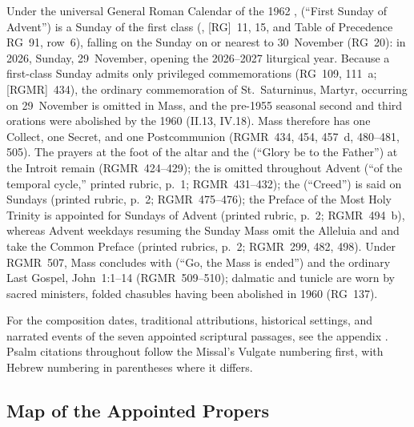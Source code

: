 Under the universal General Roman Calendar of the 1962 ,  (``First Sunday of Advent'') is a Sunday of the first class (,  [RG]~11, 15, and Table of Precedence RG~91, row~6), falling on the Sunday on or nearest to 30~November (RG~20): in 2026, Sunday, 29~November, opening the 2026--2027 liturgical year. Because a first-class Sunday admits only privileged commemorations (RG~109, 111~a;  [RGMR]~434), the ordinary commemoration of St.~Saturninus, Martyr, occurring on 29~November is omitted in Mass, and the pre-1955 seasonal second and third orations were abolished by the 1960  (II.13, IV.18). Mass therefore has one Collect, one Secret, and one Postcommunion (RGMR~434, 454, 457~d, 480--481, 505). The prayers at the foot of the altar and the  (``Glory be to the Father'') at the Introit remain (RGMR~424--429); the  is omitted throughout Advent  (``of the temporal cycle,'' printed rubric, p.~1; RGMR~431--432); the  (``Creed'') is said on Sundays (printed rubric, p.~2; RGMR~475--476); the Preface of the Most Holy Trinity is appointed for Sundays of Advent (printed rubric, p.~2; RGMR~494~b), whereas Advent weekdays resuming the Sunday Mass omit the Alleluia and  and take the Common Preface (printed rubrics, p.~2; RGMR~299, 482, 498). Under RGMR~507, Mass concludes with  (``Go, the Mass is ended'') and the ordinary Last Gospel, John~1:1--14 (RGMR~509--510); dalmatic and tunicle are worn by sacred ministers, folded chasubles having been abolished in 1960 (RG~137).

For the composition dates, traditional attributions, historical settings, and narrated events of the seven appointed scriptural passages, see the appendix \hyperref[sec:date-location]{}. Psalm citations throughout follow the Missal's Vulgate numbering first, with Hebrew numbering in parentheses where it differs.

\subsection{Map of the Appointed Propers}


